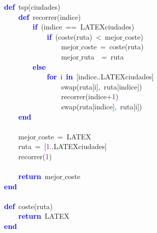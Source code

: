 \noindent
\mbox{}\textbf{\textcolor{Blue}{def}}\ tsp\textcolor{BrickRed}{(}ciudades\textcolor{BrickRed}{)} \\
\mbox{}\ \ \ \ \textbf{\textcolor{Blue}{def}}\ recorrer\textcolor{BrickRed}{(}indice\textcolor{BrickRed}{)} \\
\mbox{}\ \ \ \ \ \ \ \ \textbf{\textcolor{Blue}{if}}\ \textcolor{BrickRed}{(}indice\ \textcolor{BrickRed}{==}\ LATEXciudades\textcolor{BrickRed}{)} \\
\mbox{}\ \ \ \ \ \ \ \ \ \ \ \ \textbf{\textcolor{Blue}{if}}\ \textcolor{BrickRed}{(}coste\textcolor{BrickRed}{(}ruta\textcolor{BrickRed}{)}\ \textcolor{BrickRed}{\textless{}}\ mejor$\_$coste\textcolor{BrickRed}{)} \\
\mbox{}\ \ \ \ \ \ \ \ \ \ \ \ \ \ \ \ mejor$\_$coste\ \textcolor{BrickRed}{=}\ coste\textcolor{BrickRed}{(}ruta\textcolor{BrickRed}{)} \\
\mbox{}\ \ \ \ \ \ \ \ \ \ \ \ \ \ \ \ mejor$\_$ruta\ \ \textcolor{BrickRed}{=}\ ruta \\
\mbox{}\ \ \ \ \ \ \ \ \textbf{\textcolor{Blue}{else}} \\
\mbox{}\ \ \ \ \ \ \ \ \ \ \ \ \textbf{\textcolor{Blue}{for}}\ i\ \textbf{\textcolor{Blue}{in}}\ \textcolor{BrickRed}{[}indice\textcolor{BrickRed}{..}LATEXciudades\textcolor{BrickRed}{]} \\
\mbox{}\ \ \ \ \ \ \ \ \ \ \ \ \ \ \ \ swap\textcolor{BrickRed}{(}ruta\textcolor{BrickRed}{[}i\textcolor{BrickRed}{],}\ ruta\textcolor{BrickRed}{[}indice\textcolor{BrickRed}{])} \\
\mbox{}\ \ \ \ \ \ \ \ \ \ \ \ \ \ \ \ recorrer\textcolor{BrickRed}{(}indice\textcolor{BrickRed}{+}\textcolor{Purple}{1}\textcolor{BrickRed}{)} \\
\mbox{}\ \ \ \ \ \ \ \ \ \ \ \ \ \ \ \ swap\textcolor{BrickRed}{(}ruta\textcolor{BrickRed}{[}indice\textcolor{BrickRed}{],}\ ruta\textcolor{BrickRed}{[}i\textcolor{BrickRed}{])} \\
\mbox{}\ \ \ \ \textbf{\textcolor{Blue}{end}} \\
\mbox{} \\
\mbox{}\ \ \ \ mejor$\_$coste\ \textcolor{BrickRed}{=}\ LATEX \\
\mbox{}\ \ \ \ ruta\ \textcolor{BrickRed}{=}\ \textcolor{BrickRed}{[}\textcolor{Purple}{1}\textcolor{BrickRed}{..}LATEXciudades\textcolor{BrickRed}{]} \\
\mbox{}\ \ \ \ recorrer\textcolor{BrickRed}{(}\textcolor{Purple}{1}\textcolor{BrickRed}{)} \\
\mbox{} \\
\mbox{}\ \ \ \ \textbf{\textcolor{Blue}{return}}\ mejor$\_$coste \\
\mbox{}\textbf{\textcolor{Blue}{end}} \\
\mbox{} \\
\mbox{}\textbf{\textcolor{Blue}{def}}\ coste\textcolor{BrickRed}{(}ruta\textcolor{BrickRed}{)} \\
\mbox{}\ \ \ \ \textbf{\textcolor{Blue}{return}}\ LATEX \\
\mbox{}\textbf{\textcolor{Blue}{end}} \\
\mbox{}
